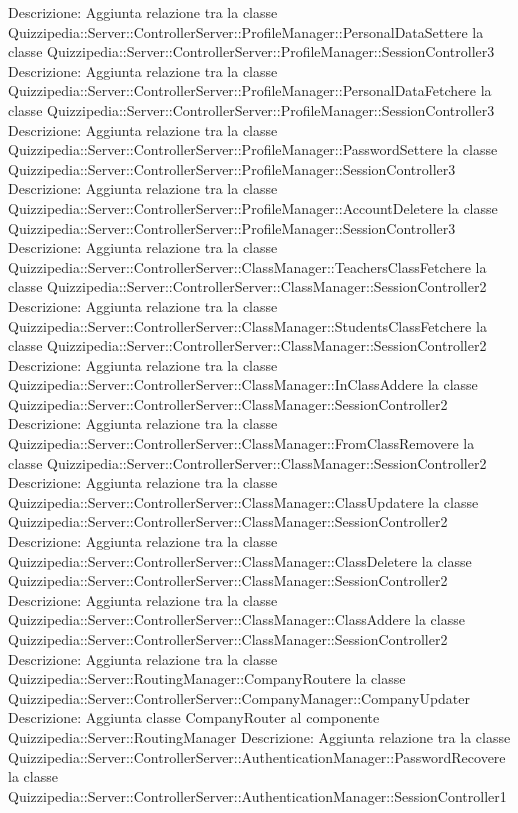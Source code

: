 Descrizione: Aggiunta relazione tra la classe Quizzipedia::Server::ControllerServer::ProfileManager::PersonalDataSettere la classe Quizzipedia::Server::ControllerServer::ProfileManager::SessionController3 
Descrizione: Aggiunta relazione tra la classe Quizzipedia::Server::ControllerServer::ProfileManager::PersonalDataFetchere la classe Quizzipedia::Server::ControllerServer::ProfileManager::SessionController3 
Descrizione: Aggiunta relazione tra la classe Quizzipedia::Server::ControllerServer::ProfileManager::PasswordSettere la classe Quizzipedia::Server::ControllerServer::ProfileManager::SessionController3 
Descrizione: Aggiunta relazione tra la classe Quizzipedia::Server::ControllerServer::ProfileManager::AccountDeletere la classe Quizzipedia::Server::ControllerServer::ProfileManager::SessionController3 
Descrizione: Aggiunta relazione tra la classe Quizzipedia::Server::ControllerServer::ClassManager::TeachersClassFetchere la classe Quizzipedia::Server::ControllerServer::ClassManager::SessionController2 
Descrizione: Aggiunta relazione tra la classe Quizzipedia::Server::ControllerServer::ClassManager::StudentsClassFetchere la classe Quizzipedia::Server::ControllerServer::ClassManager::SessionController2 
Descrizione: Aggiunta relazione tra la classe Quizzipedia::Server::ControllerServer::ClassManager::InClassAddere la classe Quizzipedia::Server::ControllerServer::ClassManager::SessionController2 
Descrizione: Aggiunta relazione tra la classe Quizzipedia::Server::ControllerServer::ClassManager::FromClassRemovere la classe Quizzipedia::Server::ControllerServer::ClassManager::SessionController2 
Descrizione: Aggiunta relazione tra la classe Quizzipedia::Server::ControllerServer::ClassManager::ClassUpdatere la classe Quizzipedia::Server::ControllerServer::ClassManager::SessionController2 
Descrizione: Aggiunta relazione tra la classe Quizzipedia::Server::ControllerServer::ClassManager::ClassDeletere la classe Quizzipedia::Server::ControllerServer::ClassManager::SessionController2 
Descrizione: Aggiunta relazione tra la classe Quizzipedia::Server::ControllerServer::ClassManager::ClassAddere la classe Quizzipedia::Server::ControllerServer::ClassManager::SessionController2 
Descrizione: Aggiunta relazione tra la classe Quizzipedia::Server::RoutingManager::CompanyRoutere la classe Quizzipedia::Server::ControllerServer::CompanyManager::CompanyUpdater 
Descrizione: Aggiunta classe CompanyRouter al componente Quizzipedia::Server::RoutingManager 
Descrizione: Aggiunta relazione tra la classe Quizzipedia::Server::ControllerServer::AuthenticationManager::PasswordRecovere la classe Quizzipedia::Server::ControllerServer::AuthenticationManager::SessionController1 
